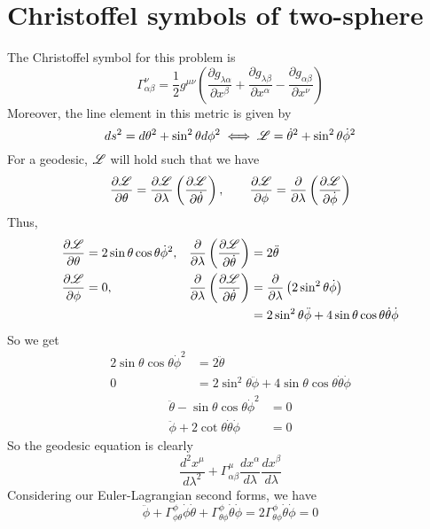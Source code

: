 \documentclass{article}
\begin{document}
	\section{Christoffel symbols of two-sphere}
		The Christoffel symbol for this problem is
		$$ \Gamma_{\alpha \beta}^\nu = \frac12 g^{\mu\nu} \left( \frac{\partial g_{\lambda \alpha}}{\partial x^\beta} + \frac{\partial g_{\lambda \beta}}{\partial x^\alpha} - \frac{\partial g_{\alpha \beta}}{\partial x^\nu}\right)$$
		Moreover, the line element in this metric is given by
		$$ ds^2 = d\theta^2 + \sin^2 \theta d\phi^2 \iff \mathscr{L} = \dot{\theta}^2 + \sin^2 \theta \dot{\phi}^2 $$
		For a geodesic, $\mathscr{L}$ will hold such that we have
		$$ \frac{\partial \mathscr{L}}{\partial \theta} = \frac{\partial \mathscr{L}}{\partial \lambda} \left( \frac{\partial \mathscr{L}}{\partial \dot{\theta}}\right),\quad\quad \frac{\partial \mathscr{L}}{\partial \phi} = \frac{\partial}{\partial \lambda} \left( \frac{\partial \mathscr{L}}{\partial \dot{\phi}} \right)  $$
		Thus,
		\begin{align*}
			\frac{\partial \mathscr{L}}{\partial \theta} &= 2 \sin \theta \cos \theta \dot{\phi}^2, & \frac{\partial}{\partial \lambda} \left( \frac{\partial \mathscr{L}}{\partial \dot{\theta}} \right) &= 2 \ddot{\theta} \\
			\frac{\partial \mathscr{L}}{\partial \phi} &= 0, & \frac{\partial}{\partial \lambda} \left( \frac{\partial \mathscr{L}}{\partial \dot{\theta}} \right) &= \frac{\partial}{\partial \lambda} \left( 2 \sin^2 \theta \dot{\phi} \right) \\
			& & &= 2\sin^2 \theta \ddot{\phi} + 4\sin \theta \cos \theta \dot{\theta} \dot{\phi}
		\end{align*}
		So we get
		\begin{align*}
			2 \sin \theta \cos \theta \dot{\phi}^2 &= 2 \ddot{\theta}  \\
			0&= 2\sin^2 \theta \ddot{\phi} + 4\sin \theta \cos \theta \dot{\theta}\dot{\phi}
		\end{align*}
		\begin{align*}
			\ddot{\theta} - \sin \theta \cos \theta \dot {\phi}^2 &= 0 \\
			\ddot{\phi} + 2 \cot \theta \dot{\theta} \dot{\phi} &= 0
		\end{align*}
		So the geodesic equation is clearly
		$$ \frac{d^2 x^\mu}{d\lambda^2} + \Gamma_{\alpha \beta}^\mu \frac{dx^\alpha}{d\lambda} \frac{dx^\beta}{d\lambda} $$
		Considering our Euler-Lagrangian second forms, we have
		$$\ddot{\phi} + \Gamma_{\phi\theta}^\phi \dot{\phi}\dot{\theta} + \Gamma_{\theta \phi}^{\phi}\dot{\theta}\dot{\phi} = 2 \Gamma_{\theta \phi}^\phi \dot{\theta}\dot{\phi} = 0$$
\end{document}
